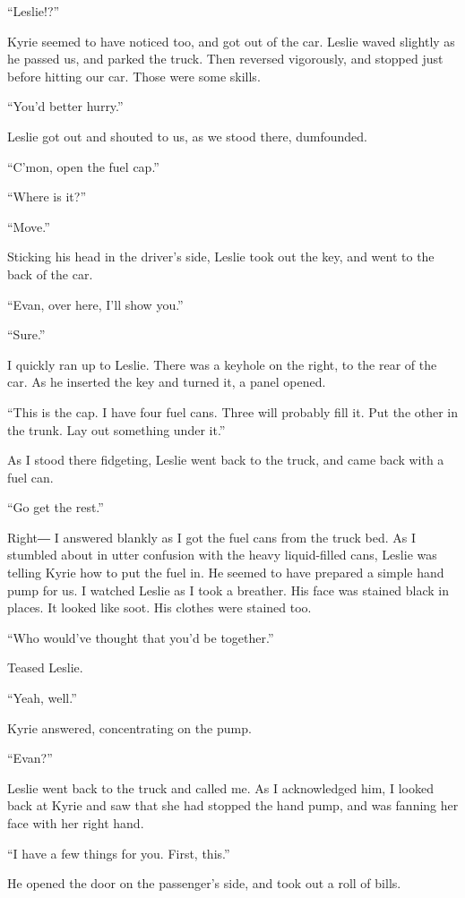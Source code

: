 \documentclass[oneside]{book}
\begin{document}
“Leslie!?”

Kyrie seemed to have noticed too, and got out of the car. Leslie waved slightly as he passed us, and parked the truck. Then reversed vigorously, and stopped just before hitting our car. Those were some skills.

“You’d better hurry.”

Leslie got out and shouted to us, as we stood there, dumfounded.

“C’mon, open the fuel cap.”

“Where is it?”

“Move.”

Sticking his head in the driver’s side, Leslie took out the key, and went to the back of the car.

“Evan, over here, I’ll show you.”

“Sure.”

I quickly ran up to Leslie. There was a keyhole on the right, to the rear of the car. As he inserted the key and turned it, a panel opened.

“This is the cap. I have four fuel cans. Three will probably fill it. Put the other in the trunk. Lay out something under it.”

As I stood there fidgeting, Leslie went back to the truck, and came back with a fuel can.

“Go get the rest.”

Right― I answered blankly as I got the fuel cans from the truck bed. As I stumbled about in utter confusion with the heavy liquid-filled cans, Leslie was telling Kyrie how to put the fuel in. He seemed to have prepared a simple hand pump for us. I watched Leslie as I took a breather. His face was stained black in places. It looked like soot. His clothes were stained too.

“Who would’ve thought that you’d be together.”

Teased Leslie.

“Yeah, well.”

Kyrie answered, concentrating on the pump.

“Evan?”

Leslie went back to the truck and called me. As I acknowledged him, I looked back at Kyrie and saw that she had stopped the hand pump, and was fanning her face with her right hand.

“I have a few things for you. First, this.”

He opened the door on the passenger’s side, and took out a roll of bills.
\end{document}
